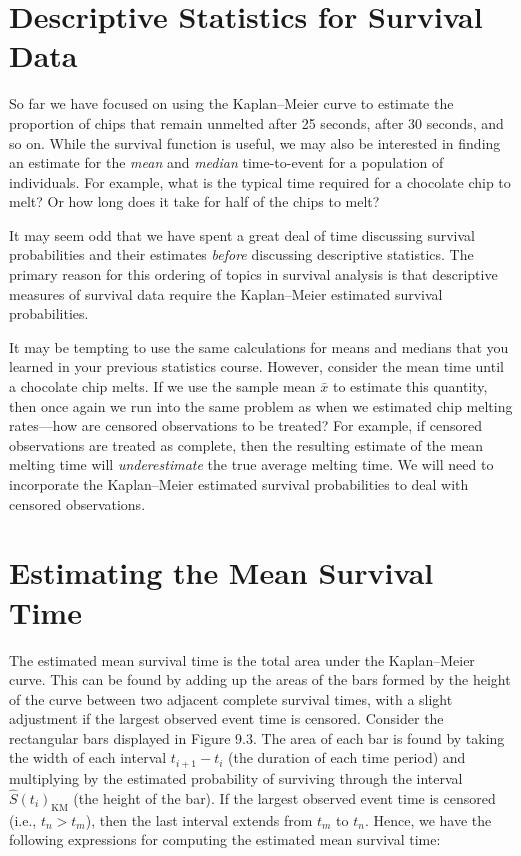 \documentclass[
]{report}
\begin{document}
\section{\texorpdfstring{\textbf{Descriptive Statistics for Survival Data}}{Descriptive Statistics for Survival Data}}\label{descriptive-statistics-for-survival-data}

So far we have focused on using the Kaplan--Meier curve to estimate the proportion of chips that remain unmelted after 25 seconds, after 30 seconds, and so on. While the survival function is useful, we may also be interested in finding an estimate for the \emph{mean} and \emph{median} time-to-event for a population of individuals. For example, what is the typical time required for a chocolate chip to melt? Or how long does it take for half of the chips to melt?

It may seem odd that we have spent a great deal of time discussing survival probabilities and their estimates \emph{before} discussing descriptive statistics. The primary reason for this ordering of topics in survival analysis is that descriptive measures of survival data require the Kaplan--Meier estimated survival probabilities.

It may be tempting to use the same calculations for means and medians that you learned in your previous statistics course. However, consider the mean time until a chocolate chip melts. If we use the sample mean \(\bar x\) to estimate this quantity, then once again we run into the same problem as when we estimated chip melting rates---how are censored observations to be treated? For example, if censored observations are treated as complete, then the resulting estimate of the mean melting time will \emph{underestimate} the true average melting time. We will need to incorporate the Kaplan--Meier estimated survival probabilities to deal with censored observations.

\section*{Estimating the Mean Survival Time}\label{estimating-the-mean-survival-time}

The estimated mean survival time is the total area under the Kaplan--Meier curve. This can be found by adding up the areas of the bars formed by the height of the curve between two adjacent complete survival times, with a slight adjustment if the largest observed event time is censored. Consider the rectangular bars displayed in Figure 9.3. The area of each bar is found by taking the width of each interval \(t_{i+1} - t_i\) (the duration of each time period) and multiplying by the estimated probability of surviving through the interval \(\hat S(t_i)_{\mathrm{KM}}\) (the height of the bar). If the largest observed event time is censored (i.e., \(t_n > t_m\)), then the last interval extends from \(t_m\) to \(t_n\). Hence, we have the following expressions for computing the estimated mean survival time:
\end{document}
